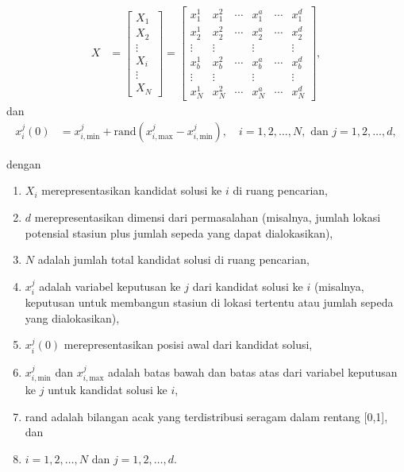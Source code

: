 \begin{align}
    X &= \begin{bmatrix}
    X_1 \\
    X_2 \\
    \vdots \\
    X_i \\
    \vdots \\
    X_N
    \end{bmatrix} 
    = \begin{bmatrix}
    x_1^1 & x_1^2 & \cdots & x_1^a & \cdots & x_1^d \\
    x_2^1 & x_2^2 & \cdots & x_2^a & \cdots & x_2^d \\
    \vdots & \vdots & & \vdots & & \vdots \\
    x_b^1 & x_b^2 & \cdots & x_b^a & \cdots & x_b^d \\
    \vdots & \vdots & & \vdots & & \vdots \\
    x_N^1 & x_N^2 & \cdots & x_N^a & \cdots & x_N^d
    \end{bmatrix},
\end{align}
dan
\begin{align}
    x_i^j(0) &= x_{i,\text{min}}^j + \text{rand}( x_{i,\text{max}}^j - x_{i,\text{min}}^j ), \quad i = 1, 2, \ldots, N, \text{ dan } j = 1, 2, \ldots, d,
\end{align}

dengan
\begin{enumerate}
    \item $X_i$ merepresentasikan kandidat solusi ke $i$ di ruang pencarian,
    \item $d$ merepresentasikan dimensi dari permasalahan (misalnya, jumlah lokasi potensial stasiun plus jumlah sepeda yang dapat dialokasikan),
    \item $N$ adalah jumlah total kandidat solusi di ruang pencarian,
    \item $x_i^j$ adalah variabel keputusan ke $j$ dari kandidat solusi ke $i$ (misalnya, keputusan untuk membangun stasiun di lokasi tertentu atau jumlah sepeda yang dialokasikan),
    \item $x_i^j(0)$ merepresentasikan posisi awal dari kandidat solusi,
    \item $x_{i,\text{min}}^j$ dan $x_{i,\text{max}}^j$ adalah batas bawah dan batas atas dari variabel keputusan ke $j$ untuk kandidat solusi ke $i$,
    \item rand adalah bilangan acak yang terdistribusi seragam dalam rentang [0,1], dan
    \item $i = 1, 2, \ldots, N$ dan $j = 1, 2, \ldots, d$.
\end{enumerate}

